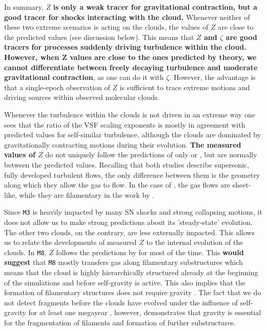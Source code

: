 In summary, $Z$ \textbf{is only a weak tracer for gravitational contraction, but a good tracer for shocks interacting with the cloud.}
Whenever neither of these two extreme scenarios is acting on the clouds, the values of $Z$ are close to the predicted values (see discussion below).
This means that \textbf{$Z$ and $\zeta$ are good tracers for processes suddenly driving turbulence within the cloud.
However, when Z values are close to the ones predicted by theory, we cannot differentiate between freely decaying turbulence and moderate gravitational contraction}, as one can do it with $\zeta$.
However, the advantage is that a single-epoch observation of $Z$ is sufficient to trace extreme motions and driving sources within observed molecular clouds.

Whenever the turbulence within the clouds is not driven in an extreme way one sees that the ratio of the VSF scaling exponents is mostly in agreement with predicted values for self-similar turbulence, although the clouds are dominated by gravitationally contracting motions during their evolution.
\textbf{The measured values of $Z$} do not uniquely follow the predictions of only \citet{Boldyrev2002} or \citet{She1994}, but are normally between the predicted values.
Recalling that both studies describe supersonic, fully developed turbulent flows, the only difference between them is the geometry along which they allow the gas to flow.
In the case of \citet{Boldyrev2002}, the gas flows are sheet-like, while they are filamentary in the work by \citet{She1994}.

Since \texttt{M3} is heavily impacted by many SN shocks and strong collapsing motions, it does not allow us to make strong predictions about its 'steady-state' evolution.
The other two clouds, on the contrary, are less externally impacted.
This allows us to relate the developments of measured $Z$ to the internal evolution of the clouds.
In \texttt{M8}, $Z$ follows the predictions by \citet{She1994} for most of the time.
This \textbf{would suggest} that \texttt{M8} mostly transfers gas along filamentary substructures which means that the cloud is highly hierarchically structured already at the beginning of the simulations and before self-gravity is active.
This also implies that the formation of filamentary structures does not require gravity \citep[e.g.,][]{Federrath2016}.
The fact that we do not detect fragments before the clouds have evolved under the influence of self-gravity for at least one megayear , however, demonstrates that gravity is essential for the fragmentation of filaments and formation of further substructures.

